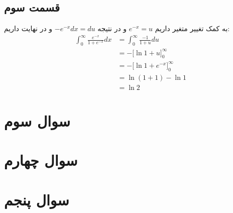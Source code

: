 \documentclass[]{article}
\begin{document}
\subsection*{قسمت سوم}
به کمک تغییر متغیر داریم
$e^{-x} = u$
و در نتیجه
$-e^{-x} dx = du$
و در نهایت داریم:
\begin{align*}
    \int_{0}^{\infty} \frac{e^{-x}}{1+e^{-x}} dx &= \int_{0}^{\infty} \frac{-1}{1+u} du\\
    &= -\Big[\ln 1 + u\Big]_{0}^{\infty}\\
    &= -\Big[\ln 1 + e^{-x}\Big]_{0}^{\infty}\\
    &= \ln (1 + 1) - \ln 1\\
    &= \boxed{\ln 2}
\end{align*}
\section*{سوال سوم}
\section*{سوال چهارم}
\section*{سوال پنجم}
\end{document}
